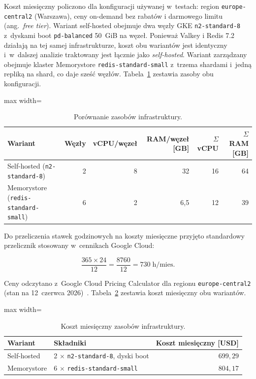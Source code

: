 Koszt miesięczny policzono dla konfiguracji używanej w~testach: region \texttt{europe-central2} (Warszawa), ceny on-demand bez rabatów i darmowego limitu (ang.~\textit{free tier}). Wariant self-hosted obejmuje dwa węzły GKE \texttt{n2-standard-8} z~dyskami boot \texttt{pd-balanced} 50~GiB na węzeł. Ponieważ Valkey i Redis 7.2 działają na tej samej infrastrukturze, koszt obu wariantów jest identyczny i~w~dalszej analizie traktowany jest łącznie jako \textit{self-hosted}. Wariant zarządzany obejmuje klaster Memorystore \texttt{redis-standard-small} z~trzema shardami i~jedną repliką na shard, co daje sześć węzłów. Tabela~\ref{tab:cost-resources} zestawia zasoby obu konfiguracji.

\begin{table}[htbp]
\centering
\caption{Porównanie zasobów infrastruktury.}
\label{tab:cost-resources}
\begin{adjustbox}{max width=\textwidth}
\begin{tabular}{lrrrrr}
\toprule
Wariant & Węzły & vCPU/węzeł & RAM/węzeł [GB] & $\Sigma$ vCPU & $\Sigma$ RAM [GB] \\
\midrule
Self-hosted (\texttt{n2-standard-8}) & 2 & 8 & 32 & 16 & 64 \\
Memorystore (\texttt{redis-standard-small}) & 6 & 2 & 6{,}5 & 12 & 39 \\
\bottomrule
\end{tabular}
\end{adjustbox}
\end{table}

\FloatBarrier

Do przeliczenia stawek godzinowych na koszty miesięczne przyjęto standardowy przelicznik stosowany w~cennikach Google Cloud:

\[
\frac{365 \times 24}{12} = \frac{8760}{12} = 730 \;\text{h/mies.}
\]

Ceny odczytano z~Google Cloud Pricing Calculator dla regionu \texttt{europe-central2} (stan na 12~czerwca 2026)~\cite{gcpCalcSelfHosted,gcpCalcMemorystore}. Tabela~\ref{tab:cost-monthly} zestawia koszt miesięczny obu wariantów.

\begin{table}[htbp]
\centering
\caption{Koszt miesięczny zasobów infrastruktury.}
\label{tab:cost-monthly}
\begin{adjustbox}{max width=\textwidth}
\begin{tabular}{llr}
\toprule
Wariant & Składniki & Koszt miesięczny [USD] \\
\midrule
Self-hosted & 2 $\times$ \texttt{n2-standard-8}, dyski boot & $699{,}29$ \\
Memorystore & 6 $\times$ \texttt{redis-standard-small} & $804{,}17$ \\
\bottomrule
\end{tabular}
\end{adjustbox}
\end{table}

